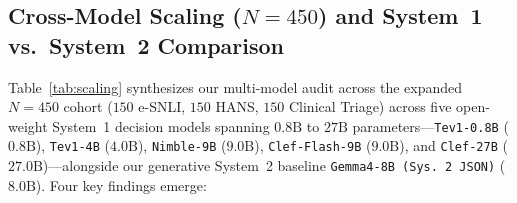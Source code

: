 \documentclass[10pt]{article}
\begin{document}
\begin{table}[!htbp]
\centering
\caption{Convergence of LIME, KernelSHAP, and S1-SHAP rankings with their $N=1{,}024$ reference estimates across coalition budgets $N \in \{128, 256, 512\}$, mean over ten inputs. Best non-reference budget is in \textbf{bold}.}
\label{tab:conv}
\small

\end{table}

\subsection{Cross-Model Scaling \texorpdfstring{($N=450$)}{(N=450)} and System~1 vs.\ System~2 Comparison}
\label{sec:scaling}
Table~\ref{tab:scaling} synthesizes our multi-model audit across the expanded $N=450$ cohort ($150$ e-SNLI, $150$ HANS, $150$ Clinical Triage) across five open-weight System~1 decision models spanning $0.8\text{B}$ to $27\text{B}$ parameters---\texttt{Tev1-0.8B} ($0.8\text{B}$), \texttt{Tev1-4B} ($4.0\text{B}$), \texttt{Nimble-9B} ($9.0\text{B}$), \texttt{Clef-Flash-9B} ($9.0\text{B}$), and \texttt{Clef-27B} ($27.0\text{B}$)---alongside our generative System~2 baseline \texttt{Gemma4-8B (Sys.\,2 JSON)} ($8.0\text{B}$).
Four key findings emerge:
\end{document}
